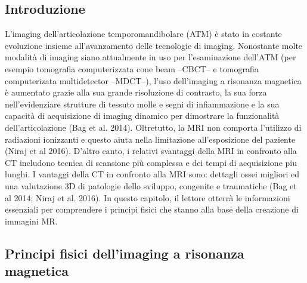 \documentclass[leqno,10pt,twocolumn,a4paper]{article}
\begin{document}
	\subsection{Introduzione}
	L'imaging dell'articolazione temporomandibolare (ATM) è stato in costante evoluzione insieme all'avanzamento delle tecnologie di imaging. Nonostante molte modalità di imaging siano attualmente in uso per l'esaminazione dell'ATM (per
	esempio tomografia computerizzata cone beam --CBCT-- e tomografia computerizata multidetector --MDCT--), l'uso dell'imaging a risonanza magnetica è aumentato grazie alla sua grande risoluzione di contrasto, la sua forza 
	nell'evidenziare strutture di tessuto molle e segni di infiammazione e la sua capacità di acquisizione di imaging dinamico per dimostrare la funzionalità dell'articolazione (Bag et al. 2014). Oltretutto, la MRI non comporta l'utilizzo di radiazioni
	ionizzanti e questo aiuta nella limitazione all'esposizione del paziente (Niraj et al 2016). D'altro canto, i relativi svantaggi della MRI in confronto alla CT includono tecnica di scansione più complessa e dei tempi di acquisizione piu lunghi.
	I vantaggi della CT in confronto alla MRI sono: dettagli ossei migliori ed una valutazione 3D di patologie dello sviluppo, congenite e traumatiche (Bag et al 2014; Niraj et al. 2016). In questo capitolo, il lettore otterrà le informazioni
	essenziali per comprendere i principi fisici che stanno alla base della creazione di immagini MR.
	\subsection{Principi fisici dell'imaging a risonanza magnetica}
\end{document}
